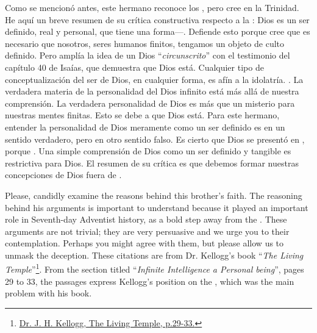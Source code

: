 Como se mencionó antes, este hermano reconoce los , pero cree en la Trinidad. He aquí un breve resumen de su crítica constructiva respecto a la : Dios es un ser definido, real y personal, que tiene una forma—. Defiende esto porque cree que es necesario que nosotros, seres humanos finitos, tengamos un objeto de culto definido. Pero amplía la idea de un Dios “\textit{circunscrito}” con el testimonio del capítulo 40 de Isaías, que demuestra que Dios está. Cualquier tipo de conceptualización del ser de Dios, en cualquier forma, es afín a la idolatría. . La verdadera materia de la personalidad del Dios infinito está más allá de nuestra comprensión. La verdadera personalidad de Dios es más que un misterio para nuestras mentes finitas. Esto se debe a que Dios está. Para este hermano, entender la personalidad de Dios meramente como un ser definido es en un sentido verdadero, pero en otro sentido falso. Es cierto que Dios se presentó en , porque . Una simple comprensión de Dios como un ser definido y tangible es restrictiva para Dios. El resumen de su crítica es que debemos formar nuestras concepciones de Dios fuera de .


Please, candidly examine the reasons behind this brother’s faith. The reasoning behind his arguments is important to understand because it played an important role in Seventh-day Adventist history, as a bold step away from the . These arguments are not trivial; they are very persuasive and we urge you to their contemplation. Perhaps you might agree with them, but please allow us to unmask the deception. These citations are from Dr. Kellogg’s book “\textit{The Living Temple}”\footnote{\href{https://archive.org/details/J.H.Kellogg.TheLivingTemple1903}{Dr. J. H. Kellogg, The Living Temple, p.29-33.}}. From the section titled “\textit{Infinite Intelligence a Personal being}”, pages 29 to 33, the passages express Kellogg’s position on the , which was the main problem with his book.


